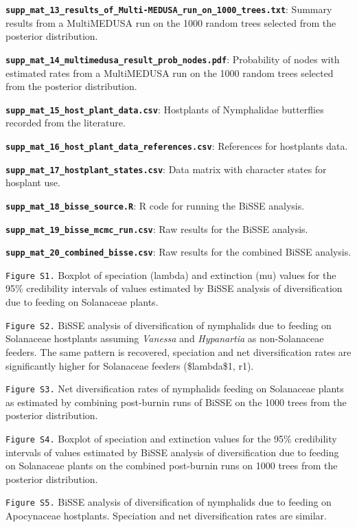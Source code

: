 \documentclass[10pt]{article}
\begin{document}
\textbf{\texttt{supp\_mat\_13\_results\_of\_Multi-MEDUSA\_run\_on\_1000\_trees.txt}}:
Summary results from a MultiMEDUSA run on the 1000 random trees selected
from the posterior distribution.

\textbf{\texttt{supp\_mat\_14\_multimedusa\_result\_prob\_nodes.pdf}}:
Probability of nodes with estimated rates from a MultiMEDUSA run on the
1000 random trees selected from the posterior distribution.

\textbf{\texttt{supp\_mat\_15\_host\_plant\_data.csv}}: Hostplants of
Nymphalidae butterflies recorded from the literature.

\textbf{\texttt{supp\_mat\_16\_host\_plant\_data\_references.csv}}:
References for hostplants data.

\textbf{\texttt{supp\_mat\_17\_hostplant\_states.csv}}: Data matrix with
character states for hosplant use.

\textbf{\texttt{supp\_mat\_18\_bisse\_source.R}}: R code for running the
BiSSE analysis.

\textbf{\texttt{supp\_mat\_19\_bisse\_mcmc\_run.csv}}: Raw results for
the BiSSE analysis.

\textbf{\texttt{supp\_mat\_20\_combined\_bisse.csv}}: Raw results for
the combined BiSSE analysis.

\texttt{Figure S1.} Boxplot of speciation (lambda) and extinction (mu)
values for the 95\% credibility intervals of values estimated by BiSSE
analysis of diversification due to feeding on Solanaceae plants.

\texttt{Figure S2.} BiSSE analysis of diversification of nymphalids due
to feeding on Solanaceae hostplants assuming \emph{Vanessa} and
\emph{Hypanartia} as non-Solanaceae feeders. The same pattern is
recovered, speciation and net diversification rates are significantly
higher for Solanaceae feeders (\$lambda\$1, r1).

\texttt{Figure S3.} Net diversification rates of nymphalids feeding on
Solanaceae plants as estimated by combining post-burnin runs of BiSSE on
the 1000 trees from the posterior distribution.

\texttt{Figure S4.} Boxplot of speciation and extinction values for the
95\% credibility intervals of values estimated by BiSSE analysis of
diversification due to feeding on Solanaceae plants on the combined
post-burnin runs on 1000 trees from the posterior distribution.

\texttt{Figure S5.} BiSSE analysis of diversification of nymphalids due
to feeding on Apocynaceae hostplants. Speciation and net diversification
rates are similar.
\end{document}
